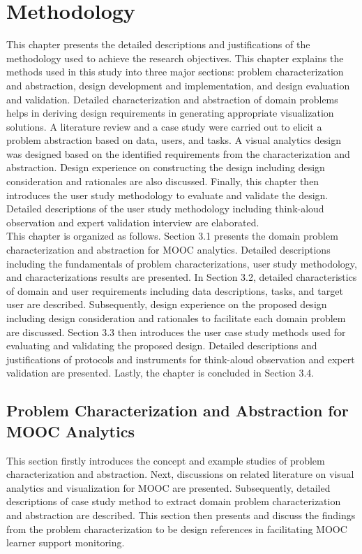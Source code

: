 
\chapter{Methodology}

This chapter presents the detailed descriptions and justifications of the methodology used to achieve the research objectives. This chapter explains the methods used in this study into three major sections: problem characterization and abstraction, design development and implementation, and design evaluation and validation. Detailed characterization and abstraction of domain problems helps in deriving design requirements in generating appropriate visualization solutions. A literature review and a case study were carried out to elicit a problem abstraction based on data, users, and tasks. A visual analytics design was designed based on the identified requirements from the characterization and abstraction. Design experience on constructing the design including design consideration and rationales are also discussed. Finally, this chapter then introduces the user study methodology to evaluate and validate the design. Detailed descriptions of the user study methodology including think-aloud observation and expert validation interview are elaborated.
\\[\baselineskip]\indent
This chapter is organized as follows. Section 3.1 presents the domain problem characterization and abstraction for MOOC analytics. Detailed descriptions including the fundamentals of problem characterizations, user study methodology, and characterizations results are presented. In Section 3.2, detailed characteristics of domain and user requirements including data descriptions, tasks, and target user are described. Subsequently, design experience on the proposed design including design consideration and rationales to facilitate each domain problem are discussed. Section 3.3 then introduces the user case study methods used for evaluating and validating the proposed design. Detailed descriptions and justifications of protocols and instruments for think-aloud observation and expert validation are presented. Lastly, the chapter is concluded in Section 3.4.

\section{Problem Characterization and Abstraction for MOOC Analytics}
This section firstly introduces the concept and example studies of problem characterization and abstraction. Next, discussions on related literature on visual analytics and visualization for MOOC are presented. Subsequently, detailed descriptions of case study method to extract domain problem characterization and abstraction are described. This section then presents and discuss the findings from the problem characterization to be design references in facilitating MOOC learner support monitoring.

